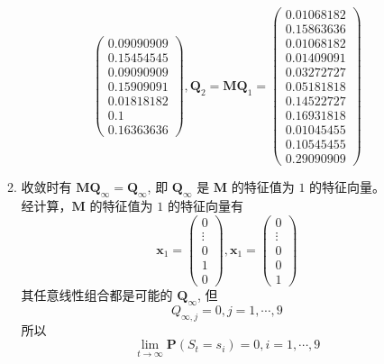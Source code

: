 \documentclass[11pt,letter,notitlepage]{article}
\begin{document}
\begin{solution}
\begin{enumerate}
\begin{enumerate}
$$\begin{pmatrix}
					            0.09090909 \\
					            0.15454545 \\
					            0.09090909 \\
					            0.15909091 \\
					            0.01818182 \\
					            0.1        \\
					            0.16363636
				            \end{pmatrix}, \mathbf{Q}_2=\mathbf{M}\mathbf{Q}_1=\begin{pmatrix}
					            0.01068182 \\
					            0.15863636 \\
					            0.01068182 \\
					            0.01409091 \\
					            0.03272727 \\
					            0.05181818 \\
					            0.14522727 \\
					            0.16931818 \\
					            0.01045455 \\
					            0.10545455 \\
					            0.29090909
				            \end{pmatrix}$$
			      \item 收敛时有 $\mathbf{M}\mathbf{Q}_\infty=\mathbf{Q}_\infty$, 即 $\mathbf{Q}_\infty$ 是 $\mathbf{M}$ 的特征值为 $1$ 的特征向量。\\
			            经计算，$\mathbf{M}$ 的特征值为 $1$ 的特征向量有
			            $$\mathbf{x}_1=\begin{pmatrix}
					            0 \\ \vdots\\0\\1\\0
				            \end{pmatrix}, \mathbf{x}_1=\begin{pmatrix}
					            0 \\ \vdots\\0\\0\\1
				            \end{pmatrix}$$
			            其任意线性组合都是可能的 $\mathbf{Q}_\infty$, 但
			            $$Q_{\infty,j}=0, j=1,\cdots,9$$
			            所以 $$\lim_{t\rightarrow\infty} \mathbf{P}(S_t=s_i)=0,i=1,\cdots,9$$

\end{enumerate}
\end{enumerate}
\end{solution}
\end{document}
